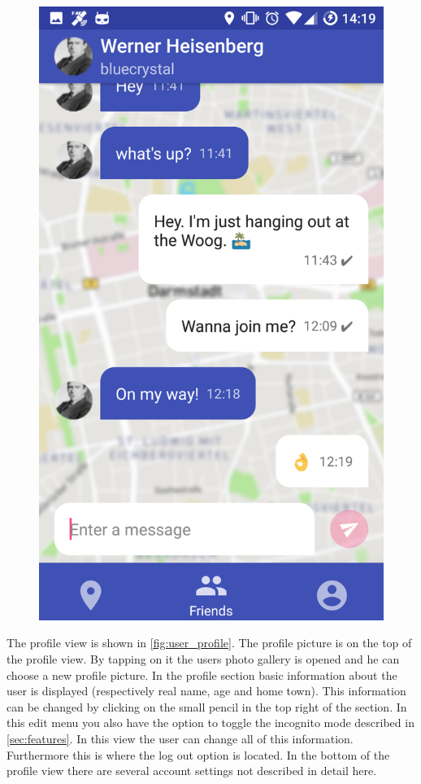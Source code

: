\documentclass[11pt, accentcolor=tud1c]{tudreport}
\begin{document}
\begin{figure}[h]
\begin{minipage}{.3\textwidth}
  \includegraphics[width=.8\linewidth]{./res/chat.png}
  \label{fig:live_chat}
\end{minipage}%
\end{figure}

The profile view is shown in \autoref{fig:user_profile}. The profile picture is on the top of the profile view. By tapping on it the users photo gallery is opened and he can choose a new profile picture. In the profile section basic information about the user is displayed (respectively real name, age and home town).
This information can be changed by clicking on the small pencil in the top right of the section. In this edit menu you also have the option to toggle the incognito mode described in \autoref{sec:features}. In this view the user can change all of this information. Furthermore this is where the log out option is located. In the bottom of the profile view there are several account settings not described in detail here.
\end{document}
